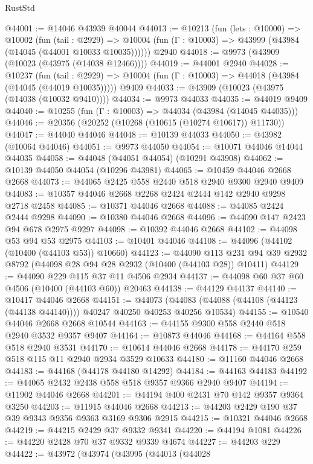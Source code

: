 \begin{lexlean}{RustStd}
\begin{coremodule}
@44001 := @14046 @43939 @40044
@44013 := @10213
    (fun (lets : @10000) =>
    @10002
      (fun (tail : @2929) =>
      @10004 (fun (Γ : @10003) => @43999 (@43984 (@14045 (@44001 @10033 @10035))))))
    @2940
@44018 := @9973 (@43909 (@10023 (@43975 (@14038 @12466))))
@44019 := @44001 @2940
@44028 := @10237
    (fun (tail : @2929) => @10004 (fun (Γ : @10003) => @44018 (@43984 (@14045 (@44019 @10035)))))
    @9409
@44033 := @43909 (@10023 (@43975 (@14038 (@10032 @9410))))
@44034 := @9973 @44033
@44035 := @44019 @9409
@44040 := @10255 (fun (Γ : @10003) => @44034 (@43984 (@14045 @44035)))
@44046 := @20356 (@20252 (@10268 (@10615 (@10274 @10617)) @11730))
@44047 := @44040 @44046
@44048 := @10139 @44033
@44050 := @43982 (@10064 @44046)
@44051 := @9973 @44050
@44054 := @10071 @44046 @14044 @44035
@44058 := @44048 (@44051 @44054) (@10291 @43908)
@44062 := @10139 @44050 @44054 (@10296 @43981)
@44065 := @10459 @44046 @2668 @2668
@44073 := @44065 @2425 @558 @2440 @518 @2940 @9300 @2940 @9409
@44083 := @10357 @44046 @2668 @2268 @2424 @2444 @142 @2940 @9298 @2718 @2458
@44085 := @10371 @44046 @2668
@44088 := @44085 @2424 @2444 @9298
@44090 := @10380 @44046 @2668
@44096 := @44090 @147 @2423 @94 @678 @2975 @9297
@44098 := @10392 @44046 @2668
@44102 := @44098 @53 @94 @53 @2975
@44103 := @10401 @44046
@44108 := @44096 (@44102 (@10400 (@44103 @53)) @10660)
@44123 := @44090
    @113
    @231
    @94
    @39
    @2932
    @8792
    (@44098 @28 @94 @28 @2932 (@10400 (@44103 @28)) @10411)
@44129 := @44090 @229 @115 @37 @11 @4506 @2934
@44137 := @44098 @60 @37 @60 @4506 (@10400 (@44103 @60)) @20463
@44138 := @44129 @44137
@44140 := @10417 @44046 @2668
@44151 := @44073
    (@44083 (@44088 (@44108 (@44123 (@44138 @44140)))) @40247 @40250 @40253 @40256 @10534)
@44155 := @10540 @44046 @2668 @2668 @10544
@44163 := @44155 @9300 @558 @2440 @518 @2940 @3532 @9357 @9407
@44164 := @10873 @44046
@44168 := @44164 @558 @518 @2940 @3531
@44170 := @10614 @44046 @2668
@44178 := @44170 @259 @518 @115 @11 @2940 @2934 @3529 @10633
@44180 := @11160 @44046 @2668
@44183 := @44168 (@44178 @44180 @14292)
@44184 := @44163 @44183
@44192 := @44065 @2432 @2438 @558 @518 @9357 @9366 @2940 @9407
@44194 := @11902 @44046 @2668
@44201 := @44194 @400 @2431 @70 @142 @9357 @9364 @3250
@44203 := @11915 @44046 @2668
@44213 := @44203 @2429 @190 @37 @39 @9343 @9356 @9363 @3169 @9306 @2915
@44215 := @10321 @44046 @2668
@44219 := @44215 @2429 @37 @9332 @9341
@44220 := @44194 @1081
@44226 := @44220 @2428 @70 @37 @9332 @9339 @4674
@44227 := @44203 @229
@44422 := @43972
    (@43974
      (@43995
        (@44013
          (@44028

\end{coremodule}
\end{lexlean}
